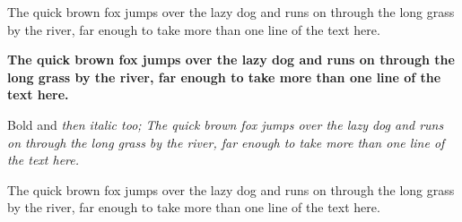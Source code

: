 \documentclass{article}
\begin{document}
The quick brown fox jumps over the lazy dog and runs on through the long grass by the river, far enough to take more than one line of the text here.

\bfseries
The quick brown fox jumps over the lazy dog and runs on through the long grass by the river, far enough to take more than one line of the text here.

Bold and \itshape then italic too; The quick brown fox jumps over the lazy dog and runs on through the long grass by the river, far enough to take more than one line of the text here.

\normalfont The quick brown fox jumps over the lazy dog and runs on through the long grass by the river, far enough to take more than one line of the text here.
\end{document}

